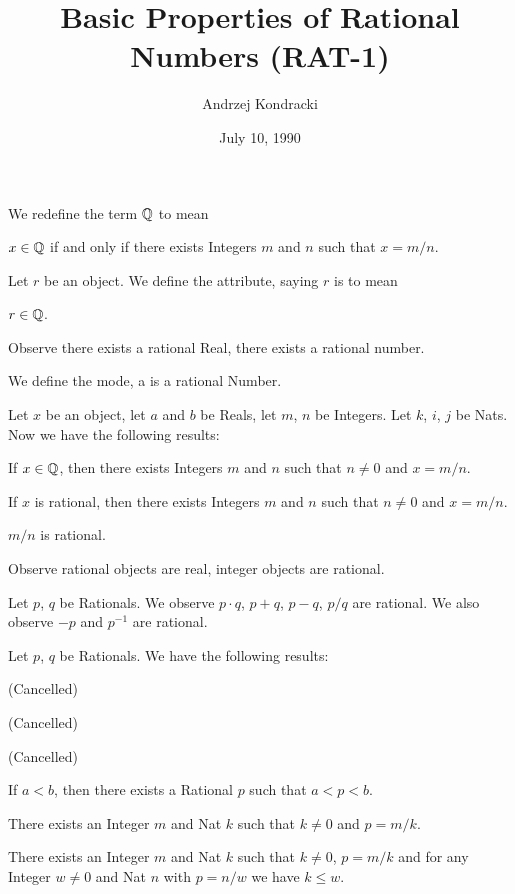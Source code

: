 \documentclass{article}
\title{Basic Properties of Rational Numbers (RAT-1)}
\author{Andrzej Kondracki}
\date{July 10, 1990}
\begin{document}
\maketitle

\begin{definition}
We redefine the term $\mathbb{Q}$ to mean
\begin{defn}
\item $x\in\mathbb{Q}$ if and only if there exists Integers $m$ and $n$ such
  that $x=m/n$.
\end{defn}
\end{definition}

\begin{definition}
Let $r$ be an object.
We define the attribute, saying $r$ is  to mean
\begin{defn}
\item $r\in\mathbb{Q}$.
\end{defn}
\end{definition}

Observe there exists a rational Real, there exists a rational number.

\begin{definition}
We define the mode, a  is a rational Number.
\end{definition}

Let $x$ be an object, let $a$ and $b$ be Reals, let $m$, $n$ be Integers.
Let $k$, $i$, $j$ be Nats.
Now we have the following results:
\begin{thm}
\item\label{rat1:1} If $x\in\mathbb{Q}$, then there exists Integers $m$ and $n$
  such that $n\neq0$ and $x=m/n$.
\item\label{rat1:2} If $x$ is rational, then there exists Integers $m$ and $n$
  such that $n\neq0$ and $x=m/n$.
\item\label{rat1:3} $m/n$ is rational.
\end{thm}

Observe rational objects are real, integer objects are rational.

Let $p$, $q$ be Rationals. We observe $p\cdot q$, $p+q$, $p-q$, $p/q$
are rational. We also observe $-p$ and $p^{-1}$ are rational.

Let $p$, $q$ be Rationals.
We have the following results:
\begin{thm}
\item\label{rat1:4} (Cancelled)
\item\label{rat1:5} (Cancelled)
\item\label{rat1:6} (Cancelled)
\item\label{rat1:7} If $a<b$, then there exists a Rational $p$ such that
  $a<p<b$.
\item\label{rat1:8} There exists an Integer $m$ and Nat $k$ such that
  $k\neq0$ and $p=m/k$.
\item\label{rat1:9} There exists an Integer $m$ and Nat $k$ such that
  $k\neq0$, $p=m/k$ and for any Integer $w\neq0$ and Nat $n$ with
  $p=n/w$ we have $k\leq w$.
\end{thm}
\end{document}
